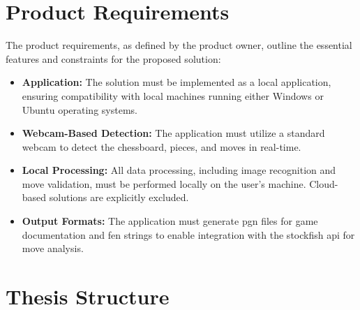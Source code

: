 \section{Product Requirements}

The product requirements, as defined by the product owner, outline the essential features and constraints for the proposed solution:

\begin{itemize}
    \item \textbf{Application:} The solution must be implemented as a local application, ensuring compatibility with local machines running either Windows or Ubuntu operating systems.

    \item \textbf{Webcam-Based Detection:} The application must utilize a standard webcam to detect the chessboard, pieces, and moves in real-time.

    \item \textbf{Local Processing:} All data processing, including image recognition and move validation, must be performed locally on the user's machine. Cloud-based solutions are explicitly excluded.

    \item \textbf{Output Formats:} The application must generate \gls{pgn} files for game documentation and \gls{fen} strings to enable integration with the \gls{stockfish} \gls{api} for move analysis.
\end{itemize}

\newpage

\section{Thesis Structure}

